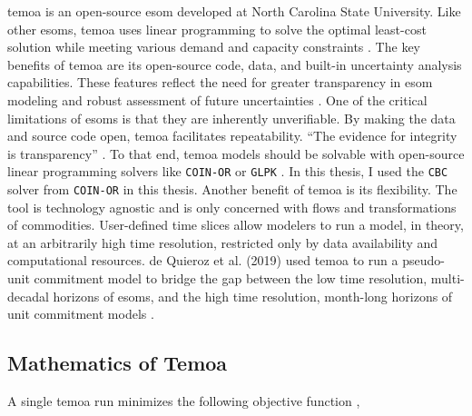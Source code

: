\gls{temoa} is an open-source \gls{esom} developed at North Carolina State University.
Like other \glspl{esom}, \gls{temoa} uses linear programming to solve the optimal
least-cost solution while meeting various demand and capacity constraints \cite{hunter_modeling_2013}.
The key benefits of \gls{temoa} are its open-source code, data, and built-in
uncertainty analysis capabilities. These features reflect the need for greater
transparency in \gls{esom} modeling and robust assessment of future uncertainties
\cite{hunter_modeling_2013}. One of the critical limitations of \glspl{esom} is that
they are inherently unverifiable. By making the data and source code open,
\gls{temoa} facilitates repeatability. ``The evidence for integrity is transparency''
\cite{decarolis_case_2012}. To that end, \gls{temoa} models should be solvable
with open-source linear programming solvers like \texttt{COIN-OR} \cite{noauthor_coin-or_nodate} or \texttt{GLPK} \cite{noauthor_glpk_nodate}. In this thesis, I used the
\texttt{CBC} solver from \texttt{COIN-OR} \cite{noauthor_cbc_2021} in this thesis.
Another benefit of \gls{temoa} is its flexibility.
The tool is technology agnostic and is only concerned with flows and transformations
of commodities. User-defined time slices allow modelers to run a model, in theory,
at an arbitrarily high time resolution, restricted only by data availability and
computational resources. de Quieroz et al. (2019) used \gls{temoa} to run a
pseudo-unit commitment model to bridge the gap between the low time resolution,
multi-decadal horizons of \glspl{esom}, and the high time resolution, month-long
horizons of unit commitment models \cite{de_queiroz_repurposing_2019}.

\subsection{Mathematics of Temoa}

A single \gls{temoa} run minimizes the following objective function \cite{noauthor_preface_nodate},

